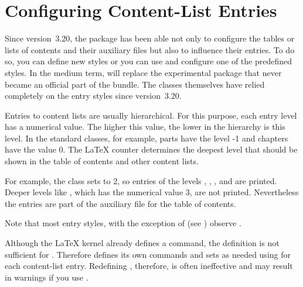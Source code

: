 \section{Configuring Content-List Entries}
%
\BeginIndexGroup
{}%

Since version~3.20, the
  package has been able not only to configure the tables or
lists of contents and their auxiliary files but also to influence their
entries. To do so, you can define new styles or you can use and configure one
of the predefined styles. In the medium term,  will replace
the experimental  package that never became an official part
of the \KOMAScript{} bundle. The \KOMAScript{} classes themselves have relied
completely on the  entry styles since version~3.20.

\begin{Declaration}
\end{Declaration}
Entries to content lists are usually hierarchical. For this purpose, each
entry level has a numerical value. The higher this value, the lower in the
hierarchy is this level. In the standard classes, for example, parts have the
level -1 and chapters have the value 0. The \LaTeX{} counter
 determines the deepest level that should be shown in the
table of contents and other content lists.

For example, the  class sets  to 2, so entries
of the levels , , , and
 are printed. Deeper levels like ,
which has the numerical value 3, are not printed. Nevertheless the entries are
part of the auxiliary file for the table of contents.

Note that most  entry styles, with the exception of
 (see ) observe .%
\EndIndexGroup


\begin{Declaration}
\end{Declaration}
Although the \LaTeX{} kernel
already defines a  command, the definition is not sufficient
for . Therefore  defines its own commands
and sets  as needed using  for
each content-list entry. Redefining , therefore, is often
ineffective and may result in warnings if you use .

